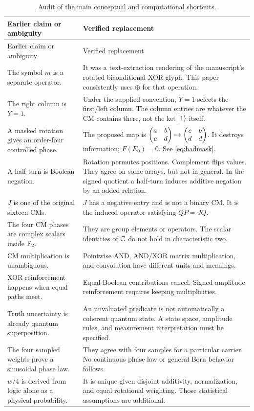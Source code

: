 \begingroup\small
\begin{longtable}{@{}L{0.31\textwidth}L{0.62\textwidth}@{}}
\caption{Audit of the main conceptual and computational shortcuts.}\\
\toprule
Earlier claim or ambiguity & Verified replacement\\
\midrule\endfirsthead
\toprule Earlier claim or ambiguity & Verified replacement\\\midrule\endhead
The symbol $m$ is a separate operator. & It was a text-extraction rendering of the manuscript's rotated-biconditional XOR glyph. This paper consistently uses $\oplus$ for that operation.\\
The right column is $Y=1$. & Under the supplied convention, $Y=1$ selects the first/left column. The column entries are whatever the CM contains there, not the ket $\lvert 1\rangle$ itself.\\
A masked rotation gives an order-four controlled phase. & The proposed map is $\begin{pmatrix}a&b\\c&d\end{pmatrix}\mapsto\begin{pmatrix}c&b\\d&d\end{pmatrix}$. It destroys information; $F(E_0)=0$. See \cref{eq:badmask}.\\
A half-turn is Boolean negation. & Rotation permutes positions. Complement flips values. They agree on some arrays, but not in general. In the signed quotient a half-turn induces additive negation by an added relation.\\
$J$ is one of the original sixteen CMs. & $J$ has a negative entry and is not a binary CM. It is the induced operator satisfying $QP=JQ$.\\
The four CM phases are complex scalars inside $\mathbb F_2$. & They are group elements or operators. The scalar identities of $\mathbb C$ do not hold in characteristic two.\\
CM multiplication is unambiguous. & Pointwise AND, AND/XOR matrix multiplication, and convolution have different units and meanings.\\
XOR reinforcement happens when equal paths meet. & Equal Boolean contributions cancel. Signed amplitude reinforcement requires keeping multiplicities.\\
Truth uncertainty is already quantum superposition. & An unvaluated predicate is not automatically a coherent quantum state. A state space, amplitude rules, and measurement interpretation must be specified.\\
The four sampled weights prove a sinusoidal phase law. & They agree with four samples for a particular carrier. No continuous phase law or general Born behavior follows.\\
$w/4$ is derived from logic alone as a physical probability. & It is unique given disjoint additivity, normalization, and equal rotational weighting. Those statistical assumptions are additional.\\

\end{longtable}
